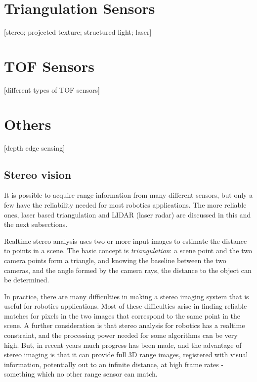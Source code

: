 \documentclass[twocolumn,oneside]{book}
\begin{document}
 
\section{Triangulation Sensors}

[stereo; projected texture; structured light; laser]

\section{TOF Sensors}

[different types of TOF sensors]

\section{Others}

[depth edge sensing]


\subsection{Stereo vision}

It is possible to acquire range information from many different
sensors, but only a few have the reliability needed for most robotics
applications.  The more reliable ones,  laser based triangulation and LIDAR (laser radar) are
discussed in this and the next subsections.

Realtime stereo analysis uses two or more input images to estimate the
distance to points in a scene.  The basic concept is {\em
  triangulation}: a scene point and the two camera points form a
triangle, and knowing the baseline between the two cameras, and the
angle formed by the camera rays, the distance to the object can be
determined.

In practice, there are many difficulties in making a stereo imaging
system that is useful for robotics applications.  Most of these
difficulties arise in finding reliable matches for pixels in the two
images that correspond to the same point in the scene.  A further
consideration is that stereo analysis for robotics has a realtime
constraint, and the processing power needed for some algorithms can be
very high.  But, in recent years much progress has been made, and the
advantage of stereo imaging is that it can provide full 3D range
images, registered with visual information, potentially out to an
infinite distance, at high frame rates - something which no other
range sensor can match.
\end{document}
